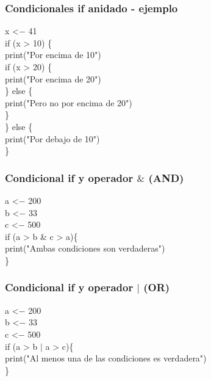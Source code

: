 \documentclass[11pt]{beamer}
\begin{document}
	\begin{frame}
		\frametitle{Condicionales if anidado - ejemplo}
		x <$-$ 41\\
		if (x > 10) \{\\
		print("Por encima de 10")\\
			if (x > 20) \{\\
				print("Por encima de 20")\\
			\} else \{ \\
				print("Pero no por encima de 20")\\
			\}\\
		\} else \{\\
			print("Por debajo de 10")\\
		\}
		
	\end{frame}

	\begin{frame}
		\frametitle{Condicional if y operador $ \&$ (AND)}
		a <$-$ 200\\
		b <$-$ 33\\
		c <$-$ 500\\
		
		if (a > b \& c > a)\{\\
			print("Ambas condiciones son verdaderas")\\
		\} 
	\end{frame}

\begin{frame}
	\frametitle{Condicional if y operador $ \mid$ (OR)}
	a <$-$ 200\\
	b <$-$ 33\\
	c <$-$ 500\\
	
	if (a > b $\mid$ a > c)\{\\
		print("Al menos una de las condiciones es verdadera")\\
	\} 
\end{frame}
\end{document}
